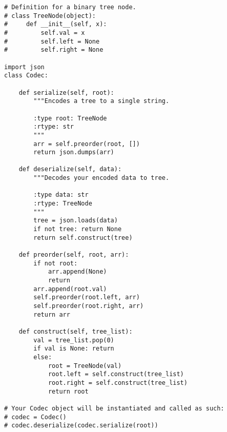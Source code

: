\begin{lstlisting}
# Definition for a binary tree node.
# class TreeNode(object):
#     def __init__(self, x):
#         self.val = x
#         self.left = None
#         self.right = None

import json
class Codec:

    def serialize(self, root):
        """Encodes a tree to a single string.
        
        :type root: TreeNode
        :rtype: str
        """
        arr = self.preorder(root, [])
        return json.dumps(arr)
    
    def deserialize(self, data):
        """Decodes your encoded data to tree.
        
        :type data: str
        :rtype: TreeNode
        """
        tree = json.loads(data)
        if not tree: return None
        return self.construct(tree)
        
    def preorder(self, root, arr):
        if not root: 
            arr.append(None)
            return
        arr.append(root.val)
        self.preorder(root.left, arr)
        self.preorder(root.right, arr)
        return arr
    
    def construct(self, tree_list):
        val = tree_list.pop(0)
        if val is None: return
        else:
            root = TreeNode(val)
            root.left = self.construct(tree_list)
            root.right = self.construct(tree_list)
            return root

# Your Codec object will be instantiated and called as such:
# codec = Codec()
# codec.deserialize(codec.serialize(root))
\end{lstlisting}


